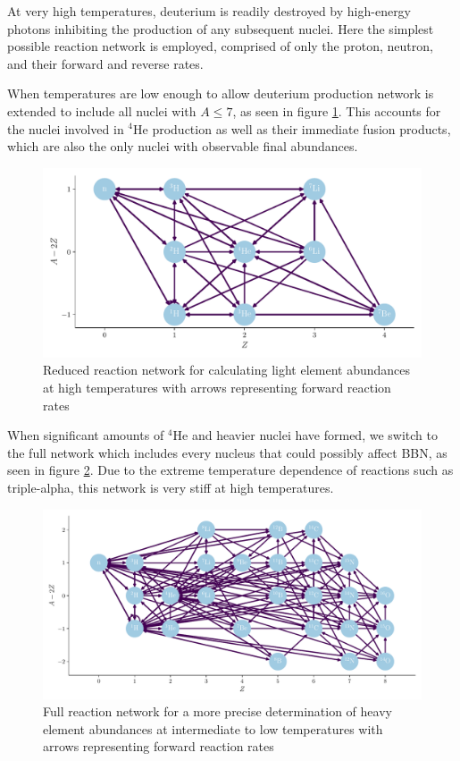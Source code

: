 At very high temperatures, deuterium is readily destroyed by high-energy photons inhibiting the production of any subsequent nuclei. Here the simplest possible reaction network is employed, comprised of only the proton, neutron, and their forward and reverse rates. 

When temperatures are low enough to allow deuterium production network is extended to include all nuclei with $A\leq 7$, as seen in figure \ref{fig:smallnet}. This accounts for the nuclei involved in ${}^4$He production as well as their immediate fusion products, which are also the only nuclei with observable final abundances. 

\begin{figure}[ht]
    \includegraphics[width=5.1in]{figures/lillenet.pdf}
    \caption{Reduced reaction network for calculating light element abundances at high temperatures with arrows representing forward reaction rates}
    \label{fig:smallnet}
\end{figure}

When significant amounts of ${}^4$He and heavier nuclei have formed, we switch to the full network which includes every nucleus that could possibly affect BBN, as seen in figure \ref{fig:bignet}. Due to the extreme temperature dependence of reactions such as triple-alpha, this network is very stiff at high temperatures. 

\begin{figure}[ht]
    \includegraphics[width=5.1in]{figures/stornet.pdf}
    \caption{Full reaction network for a more precise determination of heavy element abundances at intermediate to low temperatures with arrows representing forward reaction rates}
    \label{fig:bignet}
\end{figure}
\clearpage
